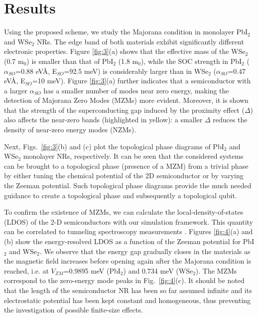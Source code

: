\documentclass[10pt,usletter,conference]{IEEEtran}
\begin{document}
\section{Results}\label{sec:res}
Using the proposed scheme, we study the Majorana
condition in monolayer PbI$_2$ and WSe$_2$ NRs. The edge band of both
materials exhibit significantly different electronic properties. Figure
\ref{fig:3}(a) shows that the
effective mass of the WSe$_2$ (0.7 m$_0$) is smaller than that of
PbI$_2$ (1.8 m$_0$), while the SOC strength in PbI$_2$
($\alpha_{SO}$=0.88 eV\AA, E$_{SO}$=92.5 meV) is considerably larger
than in WSe$_2$ ($\alpha_{SO}$=0.47 eV\AA, E$_{SO}$=10 meV). Figure
\ref{fig:3}(a) further indicates that a semiconductor with a larger $\alpha_{SO}$
has a smaller number of modes near zero energy, making the
detection of Majorana Zero Modes (MZMs) more evident. Moreover, it is shown that the strength of the
superconducting gap induced by the proximity effect ($\Delta$) also
affects the near-zero bands (highlighted in yellow): a smaller
$\Delta$ reduces the density of near-zero energy modes (NZMs).

\par Next, Figs.~\ref{fig:3}(b) and (c) plot the topological
phase diagrams of PbI$_2$ and WSe$_2$ monolayer NRs, respectively. It
can be seen that the considered systems can be brought to a topological
phase (presence of a MZM) from a trivial phase by either tuning the
chemical potential of the 2D semiconductor or by varying the Zeeman
potential. Such topological phase diagrams provide the much needed
guidance to create a topological phase and subsequently a topological
qubit.

\par To confirm the existence of MZMs, we can calculate the
local-density-of-states (LDOS) of the 2-D semiconductors with our
simulation framework. This quantity can be correlated to tunneling
spectroscopy measurements \cite{Zhang}. Figures \ref{fig:4}(a) and (b)
show the energy-resolved LDOS as a function of the Zeeman potential for
PbI$_2$ and WSe$_2$. We observe that the energy gap gradually closes
in the materials as the magnetic field increases before
opening again after the Majorana condition is reached, i.e. at
$V_{ZM}$=0.9895 meV (PbI$_2$) and 0.734 meV (WSe$_2$). The MZMs correspond to
the zero-energy mode peaks in Fig.~\ref{fig:4}(c). 
It should
be noted that the length of the semiconductor NR has been so far
assumed infinite and its electrostatic potential has been kept
constant and homogeneous, thus preventing the investigation of
possible finite-size effects.
\end{document}
